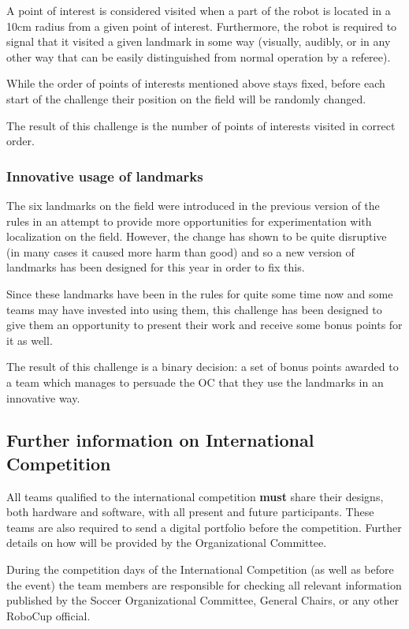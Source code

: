 \documentclass{article}
\begin{document}
A point of interest is considered visited when a part of the
    robot is located in a 10cm radius from a given point of interest.
    Furthermore, the robot is required to signal that it visited a given
    landmark in some way (visually, audibly, or in any other way that can be
    easily distinguished from normal operation by a referee).

While the order of points of interests mentioned above stays
    fixed, before each start of the challenge their position on the field will
    be randomly changed.

The result of this challenge is the number of points of
    interests visited in correct order.

\subsubsection{Innovative usage of landmarks}

The six landmarks on the field were introduced in the previous
    version of the rules in an attempt to provide more opportunities for
    experimentation with localization on the field. However, the change has
    shown to be quite disruptive (in many cases it caused more harm than good)
    and so a new version of landmarks has been designed for this year in order
    to fix this.

Since these landmarks have been in the rules for quite some
    time now and some teams may have invested into using them, this challenge
    has been designed to give them an opportunity to present their work and
    receive some bonus points for it as well.

The result of this challenge is a binary decision: a set of
    bonus points awarded to a team which manages to persuade the OC that they
    use the landmarks in an innovative way.

\subsection{Further information on International Competition \label{ref-061}}

All teams qualified to the international competition \textbf{must} share their
designs, both hardware and software, with all present and future participants.
These teams are also required to send a digital portfolio before the
competition. Further details on how will be provided by the Organizational
Committee.

During the competition days of the International Competition (as well as before
the event) the team members are responsible for checking all relevant
information published by the Soccer Organizational Committee, General Chairs,
or any other RoboCup official.
\end{document}

